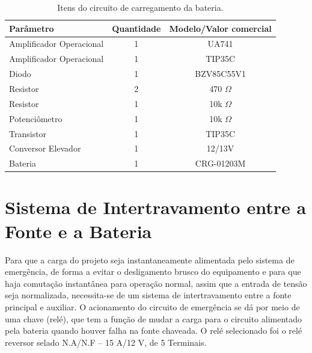 \begin{table}[H]
    \centering
    \footnotesize
    \caption{Itens do circuito de carregamento da bateria.}
    \label{Itens_circuito}
    \begin{adjustbox}{max width = \textwidth}
        \begin{tabular}{|l|c|c|}
            \hline
            \rowcolor[HTML]{A8DADC}
            \textbf{Parâmetro} & \textbf{Quantidade} & \textbf{Modelo/Valor comercial}  \\ \hline
            Amplificador Operacional & 1 & UA741
            \\ \hline
            Amplificador Operacional & 1 & TIP35C
            \\ \hline
            Diodo & 1 & BZV85C55V1
            \\ \hline
             Resistor  &  2  & 470 $\Omega$
             \\ \hline
              Resistor  & 1 & 10k $\Omega$
             \\ \hline
              
                Potenciômetro & 1 & 10k $\Omega$
             \\ \hline
                Transistor & 1 & TIP35C
             \\ \hline
                Conversor Elevador & 1 & 12/13V
             \\ \hline
                      Bateria & 1 & CRG-01203M
             \\ \hline 
        \end{tabular}
    \end{adjustbox}
\end{table}

\section{Sistema de Intertravamento entre a Fonte e a Bateria}

Para que a carga do projeto seja instantaneamente alimentada pelo sistema de emergência, de forma a evitar o desligamento brusco do equipamento e para que haja comutação instantânea para operação normal, assim que a entrada de tensão seja normalizada, necessita-se de um sistema de intertravamento entre a fonte principal e auxiliar. O acionamento do circuito de emergência se dá por meio de uma chave (relé), que tem a função de mudar a carga para o circuito alimentado pela bateria quando houver falha na fonte chaveada. O relé selecionado foi o relé reversor selado N.A/N.F – 15 A/12 V, de 5 Terminais.

